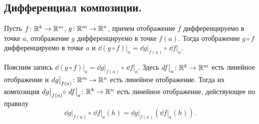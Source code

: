 \documentclass[a4paper]{article}
\theoremstyle{named}
\begin{document}
    \subsection{Дифференциал композиции.}

    \begin{theorem*}
        Пусть $f\colon \mathbb{R}^k\to \mathbb{R}^m$, $g\colon \mathbb{R}^m\to \mathbb{R}^n$, причем отображение $f$ дифференцируемо в точке $a$, отображение $g$ дифференцируемо в точке $f(a)$. Тогда отображение $g\circ f$ дифференцируемо в точке $a$ и $\dd(g\circ f)\bigl|_a = \dd g\bigl|_{f(a)}\circ\, \dd f\bigl|_a$.
    \end{theorem*}

    \begin{remark*}
        Поясним запись $\dd(g\circ f)\bigl|_a = \dd g\bigl|_{f(a)}\circ\, \dd f\bigl|_a$.
        Здесь $\mathop{}\!d f\bigl|_a\colon \mathbb{R}^k\to \mathbb{R}^m$ есть линейное отображение и $\mathop{}\!d g\bigl|_{f(a)}\colon \mathbb{R}^m\to \mathbb{R}^n$ есть линейное отображение.
        Тогда их композиция $\mathop{}\!d g\bigl|_{f(a)}\circ\, \mathop{}\!d f\bigl|_a\colon \mathbb{R}^k\to \mathbb{R}^n$ есть линейное отображение, действующее по правилу
        $$\dd g\bigl|_{f(a)}\circ\, \dd f\bigl|_a (h) = \dd g\bigl|_{f(a)} (\dd f\bigl|_a(h)).$$
    \end{remark*}
\end{document}
